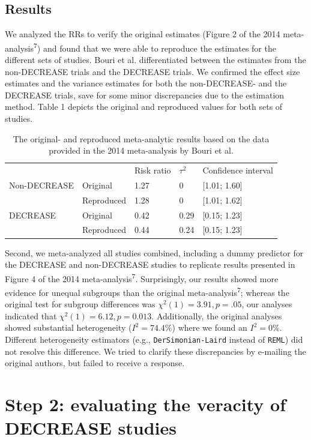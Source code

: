 \documentclass[]{article}
\begin{document}
\subsection{Results}\label{results}

We analyzed the RRs to verify the original estimates (Figure 2 of the
2014 meta-analysis\textsuperscript{7}) and found that we were able to
reproduce the estimates for the different sets of studies. Bouri et al.
differentiated between the estimates from the non-DECREASE trials and
the DECREASE trials. We confirmed the effect size estimates and the
variance estimates for both the non-DECREASE- and the DECREASE trials,
save for some minor discrepancies due to the estimation method. Table 1
depicts the original and reproduced values for both sets of studies.

\begin{longtable}[]{@{}lllll@{}}
\caption{The original- and reproduced meta-analytic results based on the
data provided in the 2014 meta-analysis by Bouri et al.}\tabularnewline
\toprule
& & Risk ratio & \(\tau^2\) & Confidence interval\tabularnewline
Non-DECREASE & Original & 1.27 & 0 & {[}1.01; 1.60{]}\tabularnewline
& Reproduced & 1.28 & 0 & {[}1.01; 1.62{]}\tabularnewline
DECREASE & Original & 0.42 & 0.29 & {[}0.15; 1.23{]}\tabularnewline
& Reproduced & 0.44 & 0.24 & {[}0.15; 1.23{]}\tabularnewline
\bottomrule
\end{longtable}

Second, we meta-analyzed all studies combined, including a dummy
predictor for the DECREASE and non-DECREASE studies to replicate results
presented in Figure 4 of the 2014 meta-analysis\textsuperscript{7}.
Surprisingly, our results showed more evidence for unequal subgroups
than the original meta-analysis\textsuperscript{7}; whereas the original
test for subgroup differences was \(\chi^2(1)=3.91,p=.05\), our analyses
indicated that \(\chi^2(1)=6.12,p=0.013\). Additionally, the original
analyses showed substantial heterogeneity (\(I^2=74.4\)\%) where we
found an \(I^2=0\)\%. Different heterogeneity estimators (e.g.,
\texttt{DerSimonian-Laird} instead of \texttt{REML}) did not resolve
this difference. We tried to clarify these discrepancies by e-mailing
the original authors, but failed to receive a response.

\section{Step 2: evaluating the veracity of DECREASE
studies}\label{step-2-evaluating-the-veracity-of-decrease-studies}
\end{document}
